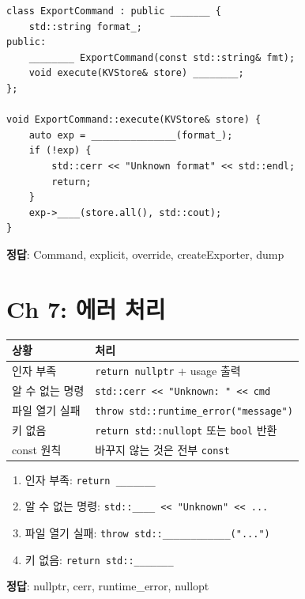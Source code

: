 \documentclass[11pt,a4paper]{article}
\newcommand{\code}[1]{\texttt{#1}}
\begin{document}
\begin{quizbox}[title={Q6-3: ExportCommand}]
\begin{lstlisting}[style=cpp,numbers=none]
class ExportCommand : public _______ {
    std::string format_;
public:
    ________ ExportCommand(const std::string& fmt);
    void execute(KVStore& store) ________;
};

void ExportCommand::execute(KVStore& store) {
    auto exp = _______________(format_);
    if (!exp) {
        std::cerr << "Unknown format" << std::endl;
        return;
    }
    exp->____(store.all(), std::cout);
}
\end{lstlisting}
\textbf{정답}: Command, explicit, override, createExporter, dump
\end{quizbox}


\section{Ch 7: 에러 처리}

\begin{tabularx}{\textwidth}{@{}lX@{}}
\toprule
\textbf{상황} & \textbf{처리} \\
\midrule
인자 부족 & \code{return nullptr} + usage 출력 \\
알 수 없는 명령 & \code{std::cerr << "Unknown: " << cmd} \\
파일 열기 실패 & \code{throw std::runtime\_error("message")} \\
키 없음 & \code{return std::nullopt} 또는 \code{bool} 반환 \\
const 원칙 & 바꾸지 않는 것은 전부 \code{const} \\
\bottomrule
\end{tabularx}

\begin{quizbox}[title={Q7-1: 에러 처리 빈칸}]
\begin{enumerate}[nosep]
\item 인자 부족: \code{return \_\_\_\_\_\_\_}
\item 알 수 없는 명령: \code{std::\_\_\_\_ << "Unknown" << ...}
\item 파일 열기 실패: \code{throw std::\_\_\_\_\_\_\_\_\_\_\_\_("...")}
\item 키 없음: \code{return std::\_\_\_\_\_\_\_}
\end{enumerate}
\textbf{정답}: nullptr, cerr, runtime\_error, nullopt
\end{quizbox}
\end{document}

